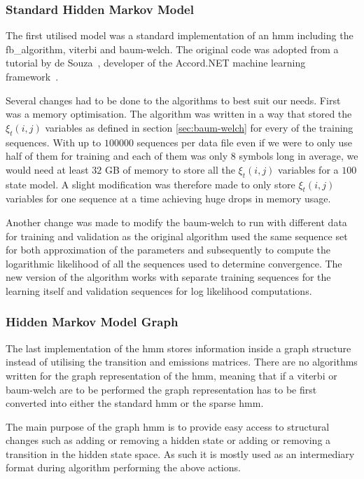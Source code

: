 \subsubsection{Standard Hidden Markov Model}

The first utilised model was a standard implementation of an \gls{hmm} including the \gls{fb_algorithm}, \gls{viterbi} and \gls{baum-welch}. The original code was adopted from a tutorial by de Souza~\cite{desouza_hmm}, developer of the Accord.NET machine learning framework~\cite{accord_net}.

Several changes had to be done to the algorithms to best suit our needs. First was a memory optimisation. The algorithm was written in a way that stored the $\xi_t(i,j)$ variables as defined in section \ref{sec:baum-welch} for every of the training sequences. With up to $100000$ sequences per data file even if we were to only use half of them for training and each of them was only $8$ symbols long in average, we would need at least $32$ GB of memory to store all the $\xi_t(i,j)$ variables for a $100$ state model. A slight modification was therefore made to only store $\xi_t(i,j)$ variables for one sequence at a time achieving huge drops in memory usage.

Another change was made to modify the \gls{baum-welch} to run with different data for training and validation as the original algorithm used the same sequence set for both approximation of the parameters and subsequently to compute the logarithmic likelihood of all the sequences used to determine convergence. The new version of the algorithm works with separate training sequences for the learning itself and validation sequences for log likelihood computations.



\subsubsection{Hidden Markov Model Graph}

The last implementation of the \gls{hmm} stores information inside a graph structure instead of utilising the transition and emissions matrices. There are no algorithms written for the graph representation of the \gls{hmm}, meaning that if a \gls{viterbi} or \gls{baum-welch} are to be performed the graph representation has to be first converted into either the standard \gls{hmm} or the sparse \gls{hmm}.

The main purpose of the graph \gls{hmm} is to provide easy access to structural changes such as adding or removing a hidden state or adding or removing a transition in the hidden state space. As such it is mostly used as an intermediary format during algorithm performing the above actions.

